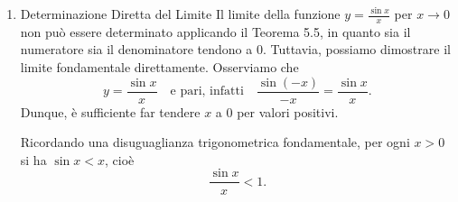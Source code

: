 \documentclass{book}
\begin{document}
\begin{enumerate}
    \item Determinazione Diretta del Limite
          Il limite della funzione \( y = \frac{\sin x}{x} \) per \( x \to 0 \) non può essere determinato applicando il Teorema 5.5, in quanto sia il numeratore sia il denominatore tendono a 0. Tuttavia, possiamo dimostrare il limite fondamentale direttamente. Osserviamo che
          \[
              y = \frac{\sin x}{x} \quad \text{e pari, infatti} \quad \frac{\sin(-x)}{-x} = \frac{\sin x}{x}.
          \]
          Dunque, è sufficiente far tendere \( x \) a 0 per valori positivi.

          Ricordando una disuguaglianza trigonometrica fondamentale, per ogni \( x > 0 \) si ha \( \sin x < x \), cioè
          \[
              \frac{\sin x}{x} < 1.
          \]\\


\end{enumerate}
\end{document}
